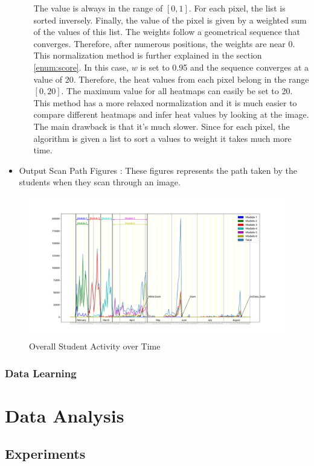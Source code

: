 \documentclass[a4paper,11pt]{report}
\numberwithin{figure}{section} %
\begin{document}
\begin{itemize}
\begin{itemize}
            The value is always in the range of $[0,1]$.
            For each pixel, the list is sorted inversely.
            Finally, the value of the pixel is given by a weighted sum of the values of this list.
            The weights follow a geometrical sequence that converges.
            Therefore, after numerous positions, the weights are near 0.
            This normalization method is further explained in the section \ref{enum:score}.
            In this case, $w$ is set to 0.95 and the sequence converges at a value of 20.
            Therefore, the heat values from each pixel belong in the range $[0,20]$.
            The maximum value for all heatmaps can easily be set to 20.
            This method has a more relaxed normalization and it is much easier to compare different heatmaps and infer heat values by looking at the image.
            The main drawback is that it's much slower.
            Since for each pixel, the algorithm is given a list to sort a values to weight it takes much more time.
        \end{itemize}
        \item[\textbullet] Output Scan Path Figures : These figures represents the path taken by the students when they scan through an image.
    \end{itemize}
    \begin{figure}[H]
      \centering
      \includegraphics[width=.45\linewidth]{timelapse.png}
      \caption{Overall Student Activity over Time}
      \label{fig:timelapse}
    \end{figure}


    \subsubsection{Data Learning}


\section{Data Analysis}

	\subsection{Experiments}
    
\end{document}
